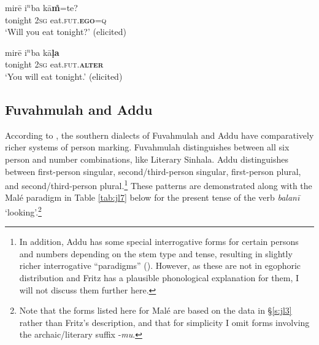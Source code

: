 \documentclass[output=paper]{langsci/langscibook}
\begin{document}
\begin{exe}
	\ex 	\label{ex:jl31}
	\gll mirē i$^n$ba kā\textbf{m̊}=te?\\
	tonight 2\textsc{sg} eat.\textsc{fut}.\textbf{\textsc{ego}}=\textsc{q}\\
	\trans ‘Will you eat tonight?’ (elicited)
\end{exe}

\begin{exe}
	\ex 	\label{ex:jl32}
	\gll mirē i$^n$ba kā\textbf{ḷa}\\
	tonight 2\textsc{sg} eat.\textsc{fut}.\textbf{\textsc{alter}}\\
	\trans ‘You will eat tonight.’ (elicited)
\end{exe}

\subsection{Fuvahmulah and Addu}\label{s:jl4-2}

According to \cite[164–184]{Fritz2002}, the southern dialects of Fuvahmulah and Addu have comparatively richer systems of person marking. Fuvahmulah distinguishes between all six person and number combinations, like Literary Sinhala. Addu distinguishes between first-person singular, second/third-person singular, first-person plural, and second/third-person plural.\footnote{In addition, Addu has some special interrogative forms for certain persons and numbers depending on the stem type and tense, resulting in slightly richer interrogative “paradigms” (\citealt[244–247]{Fritz2002}). However, as these are not in egophoric distribution and Fritz has a plausible phonological explanation for them, I will not discuss them further here.} 
These patterns are demonstrated along with the Malé paradigm in Table \ref{tab:jl7} below for the present tense of the verb \textit{balanī} ‘looking’.\footnote{Note that the forms listed here for Malé are based on the data in §\ref{s:jl3} rather than Fritz’s description, and that for simplicity I omit forms involving the archaic/literary suffix ‑\textit{mu}.}
\end{document}
